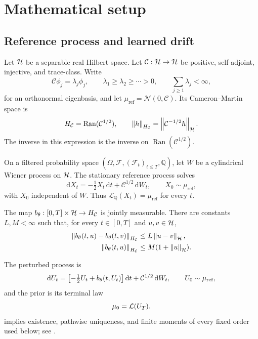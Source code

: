\section{Mathematical setup}
\label{sec:setup}

\subsection{Reference process and learned drift}

Let $\mathcal{H}$ be a separable real Hilbert space.  Let
$\mathcal C:\mathcal{H}\to\mathcal{H}$ be positive, self-adjoint, injective, and
trace-class.  Write
\[
  \mathcal C\phi_j=\lambda_j\phi_j,\qquad
  \lambda_1\geq\lambda_2\geq\cdots>0,
  \qquad \sum_{j\geq1}\lambda_j<\infty ,
\]
for an orthonormal eigenbasis, and let
$\mu_{\mathrm{ref}}=\mathcal N(0,\mathcal C)$.  Its
Cameron--Martin space is
\[
  H_{\mathcal C}=\operatorname{Ran}(\mathcal C^{1/2}),\qquad
  \left\lVert h\right\rVert_{H_{\mathcal C}}
  =\left\lVert\mathcal C^{-1/2}h\right\rVert_{\mathcal{H}}.
\]
The inverse in this expression is the inverse on
$\operatorname{Ran}(\mathcal C^{1/2})$.

On a filtered probability space
$(\Omega,\mathcal F,(\mathcal F_t)_{t\leq T},\mathbb Q)$, let $W$ be a
cylindrical Wiener process on $\mathcal{H}$.  The stationary reference process
solves
\begin{equation}
  \mathrm dX_t=-\tfrac12 X_t\,\mathrm dt
      +\mathcal C^{1/2}\,\mathrm dW_t,
  \qquad X_0\sim\mu_{\mathrm{ref}},
  \label{eq:reference-ou}
\end{equation}
with $X_0$ independent of $W$.  Thus
$\mathcal L_{\mathbb Q}(X_t)=\mu_{\mathrm{ref}}$ for every $t$.

\begin{assumption}
\label{ass:drift}
The map ${b_{\theta}}:[0,T]\times\mathcal{H}\to H_{\mathcal C}$ is jointly
measurable.  There are constants $L,M<\infty$ such that, for every
$t\in[0,T]$ and $u,v\in\mathcal{H}$,
\begin{align}
  \left\lVert{b_{\theta}}(t,u)-{b_{\theta}}(t,v)\right\rVert_{H_{\mathcal C}}
    &\leq L\left\lVert u-v\right\rVert_{\mathcal{H}}, \label{eq:drift-lipschitz}\\
  \left\lVert{b_{\theta}}(t,u)\right\rVert_{H_{\mathcal C}}
    &\leq M(1+\left\lVert u\right\rVert_{\mathcal{H}}). \label{eq:drift-growth}
\end{align}
\end{assumption}

The perturbed process is
\begin{equation}
  \mathrm dU_t
  =\bigl[-\tfrac12 U_t+{b_{\theta}}(t,U_t)\bigr]\,\mathrm dt
   +\mathcal C^{1/2}\,\mathrm dW_t,
  \qquad U_0\sim\mu_{\mathrm{ref}},
  \label{eq:prior-sde}
\end{equation}
and the prior is its terminal law
\begin{equation}
  {\mu_{0}}=\mathcal L(U_T).
  \label{eq:prior-terminal-law}
\end{equation}
 implies existence, pathwise uniqueness, and finite
moments of every fixed order used below; see
.

